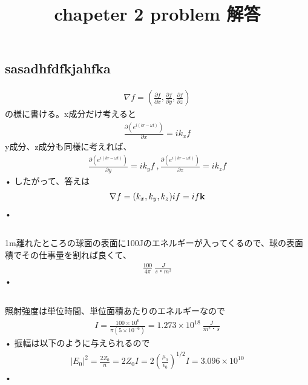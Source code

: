 \documentclass{jsarticle}
\title{chapeter 2 problem 解答}
\begin{document}
\maketitle
\renewcommand{\thesubsection}{2.\arabic{subsection})}





\subsection{sasadhfdfkjahfka}

\begin{align}
\nabla f = (\frac{\partial f}{\partial x},\frac{\partial f}{\partial y},\frac{\partial f}{\partial z}) 
\end{align}
の様に書ける。x成分だけ考えると
\begin{align}
\frac{\partial (e^{i(kr - \omega t)})}{\partial x} = ik_{x}f 
\end{align}
y成分、z成分も同様に考えれば、
\begin{align}
\frac{\partial (e^{i(kr - \omega t)})}{\partial y} = ik_{y}f \ ,
\frac{\partial (e^{i(kr - \omega t)})}{\partial z} = ik_{z}f
\end{align}•
したがって、答えは
\begin{align}
\nabla f = (k_{x},k_{y},k_{z})if = if\bf{k}
\end{align}•




\subsection{}
1m離れたところの球面の表面に100Jのエネルギーが入ってくるので、球の表面積でその仕事量を割れば良くて、
\begin{align}
\frac{100}{4\pi} \  \frac{J}{s・m^2}
\end{align}•




\subsection{}
照射強度は単位時間、単位面積あたりのエネルギーなので
\begin{align}
I = \frac{100\times 10^{6}}{\pi(5 \times 10^{-6})} = 1.273 \times 10^{18} \ \frac{J}{m^2・s}
\end{align}•
振幅は以下のように与えられるので
\begin{align}
|E_0|^{2} = \frac{2Z_0}{n} = 2Z_0 I = 2(\frac{\mu_0}{\epsilon_0})^{1/2}I = 3.096\times 10^{10}
\end{align}•
\end{document}
